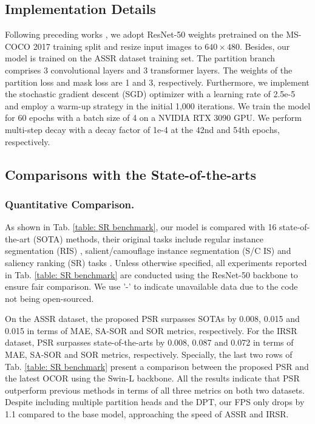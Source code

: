 \documentclass[sigconf]{acmart}
\newcommand{\tabref}[1]{Tab. \ref{#1}}
\begin{document}
\subsection{Implementation Details}
Following preceding works \cite{islam2018revisiting, siris2020inferring, liu2021instance, fang2021salient}, we adopt ResNet-50 \cite{he2016deep} weights pretrained on the MS-COCO \cite{lin2014microsoft} 2017 training split and resize input images to $640\times480$. Besides, our model is trained on the ASSR dataset training set. The partition branch comprises 3 convolutional layers and 3 transformer layers. The weights of the partition loss and mask loss are 1 and 3, respectively. Furthermore, we implement the stochastic gradient descent (SGD) optimizer with a learning rate of 2.5e-5 and employ a warm-up strategy in the initial 1,000 iterations. We train the model for 60 epochs with a batch size of 4 on a NVIDIA RTX 3090 GPU. We perform multi-step decay with a decay factor of 1e-4 at the 42nd and 54th epochs, respectively.

\subsection{Comparisons with the State-of-the-arts}
\subsubsection{Quantitative Comparison.} 
As shown in \tabref{table: SR benchmark}, our model is compared with 16 state-of-the-art (SOTA) methods, their original tasks include regular instance segmentation (RIS) \cite{cheng2022masked, cheng2022sparse, guo2021sotr, wang2020solo, wang2020solov2, he2017mask, cai2018cascade, fang2021instances}, salient/camouflage instance segmentation (S/C IS) \cite{wu2021regularized, liu2021scg, pei2022transformer, pei2022osformer} and saliency ranking (SR) tasks \cite{siris2020inferring, liu2021instance, fang2021salient, tian2022bi}. Unless otherwise specified, all experiments reported in Tab. \ref{table: SR benchmark} are conducted using the ResNet-50 backbone to ensure fair comparison. We use '-' to indicate unavailable data due to the code not being open-sourced.

On the ASSR dataset, the proposed PSR surpasses SOTAs by 0.008, 0.015 and 0.015 in terms of MAE, SA-SOR and SOR metrics, respectively. For the IRSR dataset, PSR surpasses state-of-the-arts by 0.008, 0.087 and 0.072 in terms of MAE, SA-SOR and SOR metrics, respectively. Specially, the last two rows of Tab. \ref{table: SR benchmark} present a comparison between the proposed PSR and the latest OCOR \cite{tian2022bi} using the Swin-L \cite{liu2021swin} backbone. All the results indicate that PSR outperform previous methods in terms of all three metrics on both two datasets. Despite including multiple partition heads and the DPT, our FPS only drops by 1.1 compared to the base model, approaching the speed of ASSR and IRSR.
\end{document}
